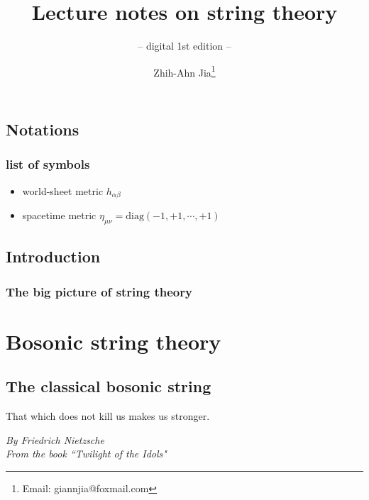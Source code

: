 \documentclass[graybox,envcountchap,sectrefs]{svmono}
\begin{document}
\author{Zhih-Ahn Jia\footnote{Email: giannjia@foxmail.com}}
\title{\textsf{Lecture notes on string theory}}
\subtitle{-- digital 1st edition --}

\maketitle

\frontmatter%

%
%
%
%

\tableofcontents

%


\mainmatter%
%

\chapter*{Notations}
\section*{list of symbols}
\begin{itemize}
	\item world-sheet metric $h_{\alpha\beta}$
	\item spacetime metric $\eta_{\mu\nu}=\mathrm{diag}(-1,+1,\cdots,+1)$
\end{itemize}




\setcounter{chapter}{-1}%
\chapter{Introduction}
\section{The big picture of string theory}


\part{Bosonic string theory}


\chapter{The classical bosonic string}
\epigraph{That which does not kill us makes us stronger.}
{\textit{By Friedrich Nietzsche\\ From the book ``Twilight of the Idols"}}
\end{document}
